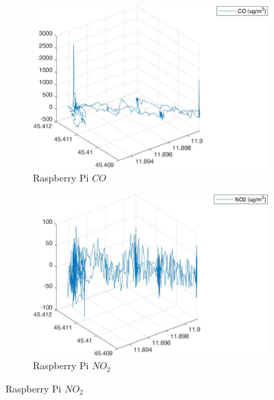 \begin{figure}
    \centering
    \begin{subfigure}[b]{0.45\textwidth}
        \centering
        \includegraphics[width=\textwidth]{images/flight-data/raspberry/CO_3D_R.jpg}
        \caption{Raspberry Pi $CO$}
        \label{fig:CO_3D_R}
    \end{subfigure}
    \hfill
    \begin{subfigure}[b]{0.45\textwidth}
        \centering
        \includegraphics[width=\textwidth]{images/flight-data/raspberry/NO2_3D_R.jpg}
        \caption{Raspberry Pi $NO_2$}
        \label{fig:NO2_3D_R}
    \end{subfigure}


\end{figure}

